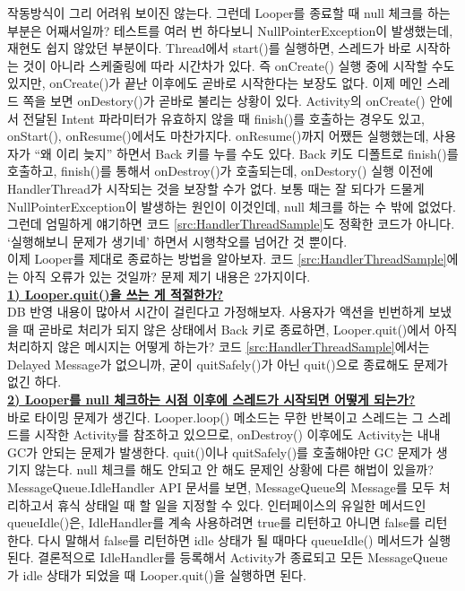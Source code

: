 작동방식이 그리 어려워 보이진 않는다.
그런데 Looper를 종료할 때 null 체크를 하는 부분은 어째서일까? 
테스트를 여러 번 하다보니 NullPointerException이 발생했는데, 재현도 쉽지 않았던 부분이다. 
Thread에서 start()를 실행하면, 스레드가 바로 시작하는 것이 아니라 스케줄링에 따라 시간차가 있다. 
즉 onCreate() 실행 중에 시작할 수도 있지만, onCreate()가 끝난 이후에도 곧바로 시작한다는 보장도 없다.
이제 메인 스레드 쪽을 보면 onDestory()가 곧바로 불리는 상황이 있다. 
Activity의 onCreate() 안에서 전달된 Intent 파라미터가 유효하지 않을 때 finish()를 호출하는 경우도 있고, onStart(), onResume()에서도 마찬가지다. 
onResume()까지 어쨌든 실행했는데, 사용자가 ``왜 이리 늦지'' 하면서 Back 키를 누를 수도 있다. 
Back 키도 디폴트로 finish()를 호출하고, 
finish()를 통해서 onDestroy()가 호출되는데, onDestory() 실행 이전에 HandlerThread가 시작되는 것을 보장할 수가 없다.
보통 때는 잘 되다가 드물게 NullPointerException이 발생하는 원인이 이것인데, null 체크를 하는 수 밖에 없었다.
그런데 엄밀하게 얘기하면 코드 \ref{src:HandlerThreadSample}도 정확한 코드가 아니다. 
`실행해보니 문제가 생기네' 하면서 시행착오를 넘어간 것 뿐이다.\\

이제 Looper를 제대로 종료하는 방법을 알아보자. 코드 \ref{src:HandlerThreadSample}에는 아직 오류가 있는 것일까?
문제 제기 내용은 2가지이다.\\

\underline{\bfseries 1) Looper.quit()을 쓰는 게 적절한가?}\\
DB 반영 내용이 많아서 시간이 걸린다고 가정해보자. 
사용자가 액션을 빈번하게 보냈을 때 곧바로 처리가 되지 않은 상태에서 Back 키로 종료하면, Looper.quit()에서 아직 처리하지 않은 메시지는 어떻게 하는가?
코드 \ref{src:HandlerThreadSample}에서는 Delayed Message가 없으니까, 굳이 quitSafely()가 아닌 quit()으로 종료해도 문제가 없긴 하다.\\

\underline{\bfseries 2) Looper를 null 체크하는 시점 이후에 스레드가 시작되면 어떻게 되는가?}\\
바로 타이밍 문제가 생긴다. 
Looper.loop() 메소드는 무한 반복이고 스레드는 그 스레드를 시작한 Activity를 참조하고 있으므로, onDestroy() 이후에도 Activity는 내내 GC가 안되는 문제가 발생한다.
quit()이나 quitSafely()를 호출해야만 GC 문제가 생기지 않는다.
null 체크를 해도 안되고 안 해도 문제인 상황에 다른 해법이 있을까?\\

MessageQueue.IdleHandler API 문서를 보면, MessageQueue의 Message를 모두 처리하고서 휴식 상태일 때 할 일을 지정할 수 있다.
인터페이스의 유일한 메서드인 queueIdle()은, IdleHandler를 계속 사용하려면 true를 리턴하고 아니면 false를 리턴한다. 다시 말해서 false를 리턴하면 idle 상태가 될 때마다 queueIdle() 메서드가 실행된다.
결론적으로 IdleHandler를 등록해서 Activity가 종료되고 모든 MessageQueue가 idle 상태가 되었을 때 Looper.quit()을 실행하면 된다.\\

